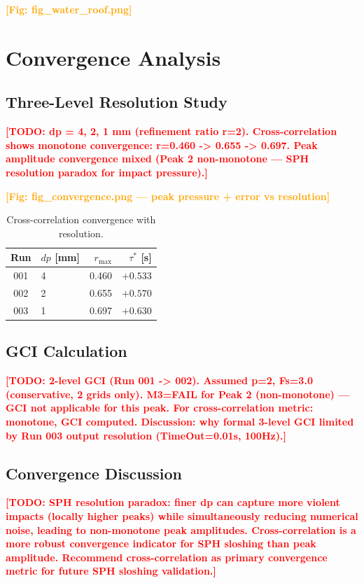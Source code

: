 \documentclass[twocolumn]{svjour3}
\newcommand{\TODO}[1]{\textcolor{red}{\textbf{[TODO: #1]}}}
\newcommand{\FIGREF}[1]{\textcolor{orange}{\textbf{[Fig: #1]}}}
\begin{document}
\FIGREF{fig\_water\_roof.png}


\section{Convergence Analysis}
\label{sec:convergence}

\subsection{Three-Level Resolution Study}
\label{sec:three-level}

\TODO{dp = 4, 2, 1 mm (refinement ratio r=2). Cross-correlation shows
monotone convergence: r=0.460 -> 0.655 -> 0.697. Peak amplitude convergence
mixed (Peak 2 non-monotone --- SPH resolution paradox for impact pressure).}

\FIGREF{fig\_convergence.png — peak pressure + error vs resolution}

\begin{table}[t]
\caption{Cross-correlation convergence with resolution.}
\label{tab:convergence}
\centering
\begin{tabular}{@{}clrr@{}}
\toprule
Run & $dp$ [mm] & $r_{\max}$ & $\tau^*$ [s] \\
\midrule
001 & 4 & 0.460 & $+0.533$ \\
002 & 2 & 0.655 & $+0.570$ \\
003 & 1 & 0.697 & $+0.630$ \\
\bottomrule
\end{tabular}
\end{table}

\subsection{GCI Calculation}
\label{sec:gci}

\TODO{2-level GCI (Run 001 -> 002). Assumed p=2, Fs=3.0 (conservative,
2 grids only). M3=FAIL for Peak 2 (non-monotone) --- GCI not applicable for
this peak. For cross-correlation metric: monotone, GCI computed.
Discussion: why formal 3-level GCI limited by Run 003 output resolution
(TimeOut=0.01s, 100Hz).}

\subsection{Convergence Discussion}
\label{sec:conv-discussion}

\TODO{SPH resolution paradox: finer dp can capture more violent impacts
(locally higher peaks) while simultaneously reducing numerical noise,
leading to non-monotone peak amplitudes. Cross-correlation is a more
robust convergence indicator for SPH sloshing than peak amplitude.
Recommend cross-correlation as primary convergence metric for future
SPH sloshing validation.}
\end{document}
